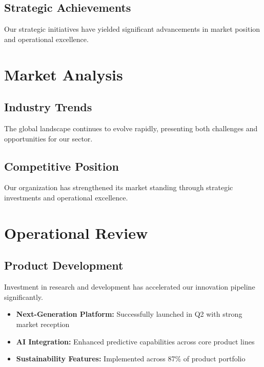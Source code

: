 \documentclass[11pt,a4paper]{article}
\begin{document}
\subsection{Strategic Achievements}

Our strategic initiatives have yielded significant advancements in market position and operational excellence.

\lipsum[1]

\section{Market Analysis}

\subsection{Industry Trends}

The global landscape continues to evolve rapidly, presenting both challenges and opportunities for our sector.

\lipsum[2]

\subsection{Competitive Position}

Our organization has strengthened its market standing through strategic investments and operational excellence.

\lipsum[3]

\section{Operational Review}

\subsection{Product Development}

Investment in research and development has accelerated our innovation pipeline significantly.

\begin{itemize}
  \item \textbf{Next-Generation Platform:} Successfully launched in Q2 with strong market reception
  \item \textbf{AI Integration:} Enhanced predictive capabilities across core product lines
  \item \textbf{Sustainability Features:} Implemented across 87\% of product portfolio
\end{itemize}
\end{document}
